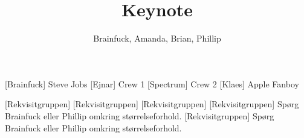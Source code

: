 \documentclass[a4paper,11pt]{article}
\title{Keynote}
\author{Brainfuck, Amanda, Brian, Phillip}
\begin{document}
 \maketitle

\begin{roles}
	[Brainfuck] Steve Jobs
	[Ejnar] Crew 1
	[Spectrum] Crew 2
	[Klaes] Apple Fanboy
\end{roles}

\begin{props}
	[Rekvisitgruppen]
	[Rekvisitgruppen]
	[Rekvisitgruppen]
	[Rekvisitgruppen] Spørg Brainfuck eller Phillip omkring størrelseforhold.
	[Rekvisitgruppen] Spørg Brainfuck eller Phillip omkring størrelseforhold.
\end{props}
\end{document}
